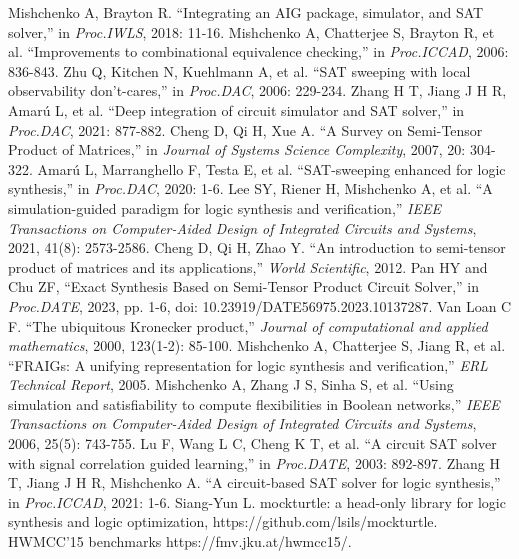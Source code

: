 \documentclass[conference]{IEEEtran}
\begin{document}
\footnotesize
\begin{thebibliography}{00}
     Mishchenko A, Brayton R. ``Integrating an AIG package, simulator, and SAT solver,'' in \emph{Proc.IWLS}, 2018: 11-16.
     Mishchenko A, Chatterjee S, Brayton R, et al. ``Improvements to combinational equivalence checking,'' in \emph{Proc.ICCAD}, 2006: 836-843.
     Zhu Q, Kitchen N, Kuehlmann A, et al. ``SAT sweeping with local observability don't-cares,'' in \emph{Proc.DAC}, 2006: 229-234.
     Zhang H T, Jiang J H R, Amarú L, et al. ``Deep integration of circuit simulator and SAT solver,'' in \emph{Proc.DAC}, 2021: 877-882.
     Cheng D, Qi H, Xue A. ``A Survey on Semi-Tensor Product of Matrices,'' in \emph{Journal of Systems Science Complexity}, 2007, 20: 304-322.
     Amarú L, Marranghello F, Testa E, et al. ``SAT-sweeping enhanced for logic synthesis,'' in \emph{Proc.DAC}, 2020: 1-6.
     Lee SY, Riener H, Mishchenko A, et al. ``A simulation-guided paradigm for logic synthesis and verification,'' \emph{IEEE Transactions on Computer-Aided Design of Integrated Circuits and Systems}, 2021, 41(8): 2573-2586.
     Cheng D, Qi H, Zhao Y. ``An introduction to semi-tensor product of matrices and its applications,'' \emph{World Scientific}, 2012.
     Pan HY and Chu ZF, ``Exact Synthesis Based on Semi-Tensor Product Circuit Solver,'' in \emph{Proc.DATE}, 2023, pp. 1-6, doi: 10.23919/DATE56975.2023.10137287.
     Van Loan C F. ``The ubiquitous Kronecker product,'' \emph{Journal of computational and applied mathematics}, 2000, 123(1-2): 85-100.
     Mishchenko A, Chatterjee S, Jiang R, et al. ``FRAIGs: A unifying representation for logic synthesis and verification,'' \emph{ERL Technical Report}, 2005.
     Mishchenko A, Zhang J S, Sinha S, et al. ``Using simulation and satisfiability to compute flexibilities in Boolean networks,'' \emph{IEEE Transactions on Computer-Aided Design of Integrated Circuits and Systems}, 2006, 25(5): 743-755.
     Lu F, Wang L C, Cheng K T, et al. ``A circuit SAT solver with signal correlation guided learning,'' in \emph{Proc.DATE}, 2003: 892-897.
     Zhang H T, Jiang J H R, Mishchenko A. ``A circuit-based SAT solver for logic synthesis,'' in \emph{Proc.ICCAD}, 2021: 1-6.
     Siang-Yun  L. mockturtle: a head-only library for logic synthesis and logic optimization, https://github.com/lsils/mockturtle.
     HWMCC'15 benchmarks https://fmv.jku.at/hwmcc15/.
\end{thebibliography}
\end{document}

